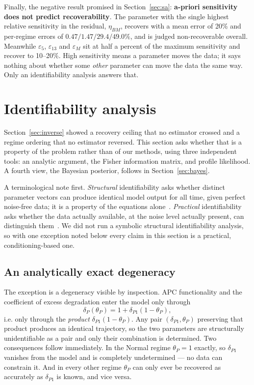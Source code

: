 \documentclass[11pt]{article}
\newcommand{\thP}{\theta_P}
\begin{document}
Finally, the negative result promised in Section~\ref{sec:sa}: \textbf{a-priori
sensitivity does not predict recoverability}. The parameter with the single
highest relative sensitivity in the residual, $\eta_{BM}$, recovers with a mean
error of 20\% and per-regime errors of $0.47/1.47/29.4/49.0\%$, and is judged
non-recoverable overall. Meanwhile $\varepsilon_5$, $\varepsilon_{13}$ and
$\varepsilon_M$ sit at half a percent of the maximum sensitivity and recover to
10--20\%. High sensitivity means a parameter moves the data; it says nothing
about whether some \emph{other} parameter can move the data the same way. Only
an identifiability analysis answers that.
\section{Identifiability analysis}
\label{sec:ident}

Section~\ref{sec:inverse} showed a recovery ceiling that no estimator crossed
and a regime ordering that no estimator reversed. This section asks whether
that is a property of the problem rather than of our methods, using three
independent tools: an analytic argument, the Fisher information matrix, and
profile likelihood. A fourth view, the Bayesian posterior, follows in
Section~\ref{sec:bayes}.

A terminological note first. \emph{Structural} identifiability asks whether
distinct parameter vectors can produce identical model output for all time,
given perfect noise-free data; it is a property of the equations
alone~\citep{chis2011structural,villaverde2016structural}. \emph{Practical}
identifiability asks whether the data actually available, at the noise level
actually present, can distinguish them~\citep{raue2009identifiability,%
wieland2021identifiability}. We did not run a symbolic structural
identifiability analysis, so with one exception noted below every claim in this
section is a practical, conditioning-based one.

\subsection{An analytically exact degeneracy}

The exception is a degeneracy visible by inspection. APC functionality and the
coefficient of excess degradation enter the model only through
\begin{equation}
\delta_P(\thP) = 1 + \delta_{P1}(1-\thP),
\end{equation}
i.e. only through the \emph{product} $\delta_{P1}(1-\thP)$. Any pair
$(\delta_{P1}, \thP)$ preserving that product produces an identical trajectory,
so the two parameters are structurally unidentifiable as a pair and only their
combination is determined. Two consequences follow immediately. In the Normal
regime $\thP = 1$ exactly, so $\delta_{P1}$ vanishes from the model and is
completely undetermined --- no data can constrain it. And in every other regime
$\thP$ can only ever be recovered as accurately as $\delta_{P1}$ is known, and
vice versa.
\end{document}
